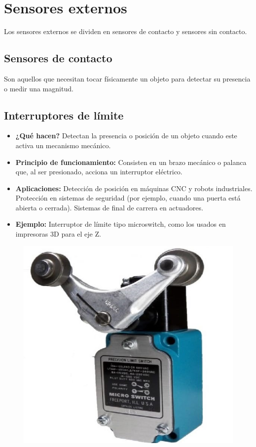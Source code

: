 \section{Sensores externos} \label{sec:sensores ecternos}
Los sensores externos se dividen en sensores de contacto y sensores sin contacto. 
\subsection{Sensores de contacto}
Son aquellos que necesitan tocar físicamente un objeto para detectar su presencia o medir una magnitud.
\subsection*{Interruptores de límite}
\begin{itemize}
	\item \textbf{¿Qué hacen?} Detectan la presencia o posición de un objeto cuando este activa un mecanismo mecánico.
	\item \textbf{Principio de funcionamiento:} Consisten en un brazo mecánico o palanca que, al ser presionado, acciona un interruptor eléctrico.
	\item \textbf{Aplicaciones:} Detección de posición en máquinas CNC y robots industriales.
	Protección en sistemas de seguridad (por ejemplo, cuando una puerta está abierta o cerrada).
	Sistemas de final de carrera en actuadores.
	\item \textbf{Ejemplo:} Interruptor de límite tipo microswitch, como los usados en impresoras 3D para el eje Z.
\end{itemize}
\begin{figure}[h]
	\centering
	\includegraphics[width=0.3\linewidth]{img/sensor de limite}
	\label{fig:sensor de limite}
\end{figure}
